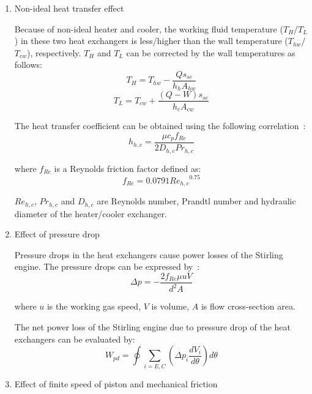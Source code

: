 \begin{enumerate}[label=(\arabic*)]
\item Non-ideal heat transfer effect

Because of non-ideal heater and cooler, the working fluid temperature ($T_{H}$/$T_L$) in these two heat exchangers is less/higher than the wall temperature ($T_{hw}$/$T_{cw}$), respectively. $T_{H}$ and $T_{L}$ can be corrected by the wall temperatures as follows:
\begin{equation}
	T_H = T_{hw} - \frac{Qs_{se}}{h_hA_{hw}}
	\label{eq:T_H}
\end{equation}
\begin{equation}
	T_L = T_{cw} + \frac{(Q-W)s_{se}}{h_cA_{cw}}
	\label{eq:T_L}
\end{equation}

The heat transfer coefficient can be obtained using the following correlation~\cite{Babaelahi2015}:
\begin{equation}
	h_{h,c} = \frac{\mu c_pf_{Re}}{2D_{h,c}Pr_{h,c}}
\end{equation}

where $f_{Re}$ is a Reynolds friction factor defined as:
\begin{equation}
	f_{Re} = 0.0791{Re_{h,c}}^{0.75}
\end{equation}

$Re_{h,c}$, $Pr_{h,c}$ and $D_{h,c}$ are Reynolds number, Prandtl number and hydraulic diameter of the heater/cooler exchanger.

\item Effect of pressure drop

Pressure drops in the heat exchangers cause power losses of the Stirling engine. The pressure drops can be expressed by~\cite{Urieli1984}:
\begin{equation}
	\Delta p = -\frac{2f_{Re}\mu u V}{d^2A}
\end{equation}

where $u$ is the working gas speed, $V$ is volume, $A$ is flow cross-section area.

The net power loss of the Stirling engine due to pressure drop of the heat exchangers can be evaluated by:
\begin{equation}
	W_{pd} = \oint\underset{i = E,C}{\sum}(\Delta p_{i}\frac{dV_i}{d\theta})d\theta
\end{equation}

\item Effect of finite speed of piston and mechanical friction


\end{enumerate}
